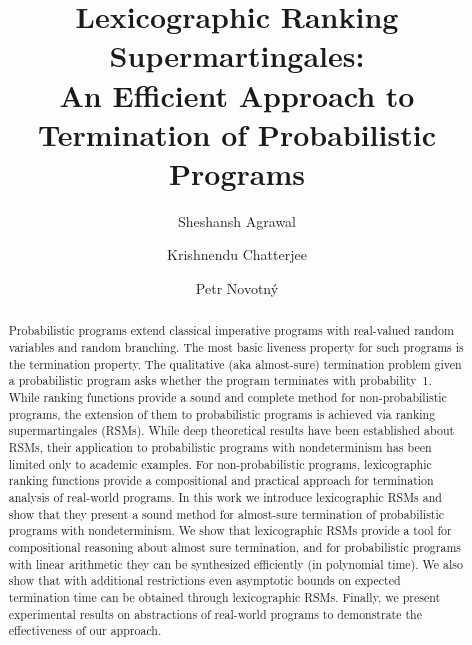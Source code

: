 \documentclass[acmsmall, anonymous, review]{acmart}
\theoremstyle{example}
\begin{document}

\title{Lexicographic Ranking Supermartingales:\\ An Efficient Approach to 
Termination of Probabilistic Programs}

\author{Sheshansh Agrawal}

\author{Krishnendu Chatterjee}

\author{Petr Novotn\'{y}}

\begin{abstract}
Probabilistic programs extend classical imperative programs with 
real-valued random variables and random branching.
The most basic liveness property for such programs is the termination 
property.
The qualitative (aka almost-sure) termination problem given a probabilistic program
asks whether the program terminates with probability~1.
While ranking functions provide a sound and complete method for 
non-probabilistic
programs, the extension of them to probabilistic programs is achieved
via ranking supermartingales (RSMs). 
While deep theoretical results have been established about RSMs, 
their application to probabilistic programs with nondeterminism has been limited
only to academic examples. 
For non-probabilistic programs, lexicographic ranking functions provide a 
compositional
and practical approach for termination analysis of real-world programs. 
In this work we introduce lexicographic RSMs and show that they present a sound
method for almost-sure termination of probabilistic programs with nondeterminism.
We show that lexicographic RSMs provide a tool for compositional reasoning 
about almost sure termination,
and for probabilistic programs with linear arithmetic they can be synthesized 
efficiently (in polynomial time).
We also show that with additional restrictions even asymptotic bounds on expected
termination time can be obtained through lexicographic RSMs.
Finally, we present experimental results on abstractions of real-world programs
to demonstrate the effectiveness of our approach.
\end{abstract}



\maketitle
\end{document}
